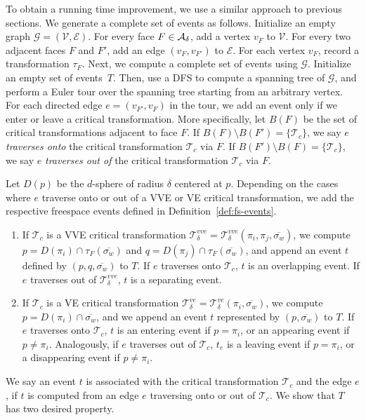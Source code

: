 \documentclass[thm-restate]{lipics-v2021}
\theoremstyle{remark}
\newcommand{\disk}[1]{D(#1)}
\newcommand{\graph}[0]{\mathcal{G}}
\newcommand{\edges}[0]{\mathcal{E}}
\newcommand{\vertices}[0]{\mathcal{V}}
\newcommand{\trans}[0]{\mathcal{T}}
\newcommand{\vvetrans}[0]{\mathcal{T}^{vve}_\delta}
\newcommand{\vetrans}[0]{\mathcal{T}^{ve}_\delta}
\newcommand{\cseg}[1]{\overline{#1}}
\begin{document}
To obtain a running time improvement, we use a similar approach to previous sections. We generate a complete set of events as follows. Initialize an empty graph $\graph = (\vertices, \edges)$. For every face $F \in \mathcal{A_\delta}$, add a vertex $v_F$ to $\vertices$. For every two adjacent faces $F$ and $F'$, add an edge $(v_F, v_{F'})$ to $\edges$. For each vertex $v_F$, record a transformation $\tau_F$. Next, we compute a complete set of events using $\graph$. Initialize an empty set of events~$T$. Then, use a DFS to compute a spanning tree of $\graph$, and perform a Euler tour over the spanning tree starting from an arbitrary vertex. For each directed edge $e = (v_{F'}, v_{F})$ in the tour, we add an event only if we enter or leave a critical transformation. More specifically, let $B(F)$ be the set of critical transformations adjacent to face $F$. If $B(F) \setminus B(F') = \{\trans_{c}\}$, we say $e$ \emph{traverses onto} the critical transformation $\trans_{c}$ via $F$. If $B(F') \setminus B(F) = \{\trans_c\}$, we say $e$ \emph{traverses out of} the critical transformation $\trans_{c}$ via $F$. 

Let $\disk{p}$ be the $d$-sphere of radius $\delta$ centered at $p$. Depending on the cases where $e$ traverse onto or out of a VVE or VE critical transformation, we add the respective freespace events defined in Definition~\ref{def:fs-events}. 
\begin{enumerate}
    \item If $\trans_c$ is a VVE critical transformation $\vvetrans = \vvetrans(\pi_i, \pi_j, \cseg{\sigma_w})$, we compute $p = \disk{\pi_i} \cap \tau_F(\cseg{\sigma_w})$ and $q = \disk{\pi_j} \cap \tau_F(\cseg{\sigma_w})$, and append an event $t$ defined by $(p, q, \cseg{\sigma_w})$ to $T$. If $e$ traverses onto $\trans_c$, $t$ is an overlapping event. If $e$ traverses out of $\vvetrans$, $t$ is a separating event. 
    \item If $\trans_c$ is a VE critical transformation $\vetrans = \vetrans(\pi_i, \cseg{\sigma_w})$, we compute $p = \disk{\pi_i} \cap \cseg{\sigma_w}$, and we append an event $t$ represented by $(p, \cseg{\sigma_w})$ to $T$. If $e$ traverses onto $\trans_c$, $t$ is an entering event if $p = \pi_i$, or an appearing event if $p \neq \pi_i$. Analogously, if $e$ traverses out of $\trans_c$, $t_e$ is a leaving event if $p = \pi_i$, or a disappearing event if $p \neq \pi_i$. 
\end{enumerate}

We say an event $t$ is associated with the critical transformation $\trans_c$ and the edge $e$, if $t$ is computed from an edge $e$ traversing onto or out of $\trans_c$. We show that $T$ has two desired property. 
\end{document}
